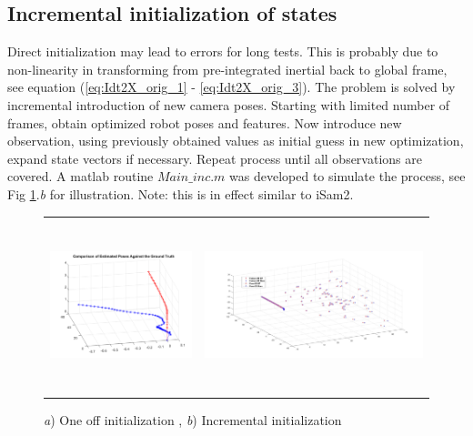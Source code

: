 \documentclass[12pt]{article}   %
\begin{document}
\subsection{Incremental initialization of states}
Direct initialization may lead to errors for long tests. This is probably due to non-linearity in transforming from pre-integrated inertial back to global frame, see equation (\ref{eq:Idt2X_orig_1} - \ref{eq:Idt2X_orig_3}). The problem is solved by incremental introduction of new camera poses. Starting with limited number of frames, obtain optimized robot poses and features. Now introduce new observation, using previously obtained values as initial guess in new optimization, expand state vectors if necessary. Repeat process until all observations are covered. A matlab routine $Main\_inc.m$ was developed to simulate the process, see Fig \ref{fig:preint_init}.\emph{b} for illustration. Note: this is in effect similar to iSam2.

	\begin{figure}[h!]
		\begin{center}\begin{tabular}{cc}
				\includegraphics[height=5cm]{figures/simuNpose_error.png} &
				\includegraphics[height=5cm]{figures/Final_pose-feature_3D_GT-vs-SLAM.jpg}\\				
			\end{tabular}\end{center}
			\caption{\emph{a}) One off initialization , \emph{b}) Incremental initialization } 
			\label{fig:preint_init}
	\end{figure} 
\end{document}
